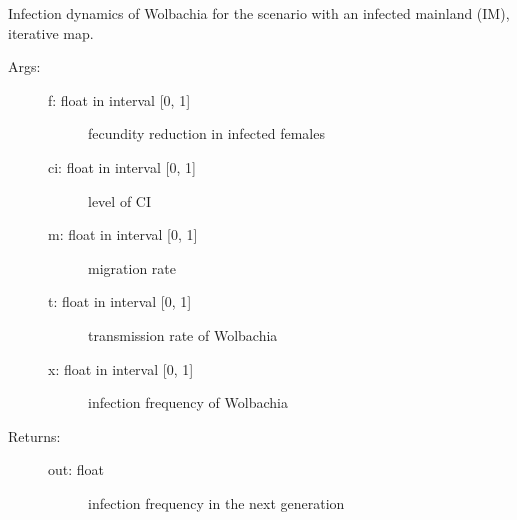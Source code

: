 \documentclass[letterpaper,10pt,english]{sphinxmanual}
\begin{document}
\begin{fulllineitems}
\label{index:wspec.analytical.dynamics_IM}
Infection dynamics of Wolbachia for the scenario with an infected 
mainland (IM), iterative map.
\begin{description}
\item[{Args:}] \leavevmode\begin{description}
\item[{f: float in interval {[}0, 1{]}}] \leavevmode
fecundity reduction in infected females

\item[{ci: float in interval {[}0, 1{]}}] \leavevmode
level of CI

\item[{m: float in interval {[}0, 1{]}}] \leavevmode
migration rate

\item[{t: float in interval {[}0, 1{]}}] \leavevmode
transmission rate of Wolbachia

\item[{x: float in interval {[}0, 1{]}}] \leavevmode
infection frequency of Wolbachia

\end{description}

\item[{Returns:}] \leavevmode\begin{description}
\item[{out: float}] \leavevmode
infection frequency in the next generation

\end{description}

\end{description}

\end{fulllineitems}

\end{document}
